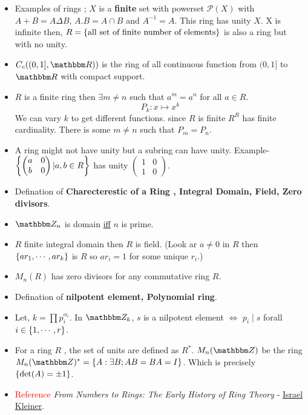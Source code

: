 \documentclass[lec]{subfiles}
\begin{document}
\begin{itemize}
    \item Examples of rings ; $X$ is a \textbf{finite} set with powerset $\mathcal{P}(X)$ with $A+B = A \Delta B$, $A.B = A \cap B$ and $A^{-1} = A$. This ring has unity $X$. X is infinite then, $R = \qty{ \text{all set of finite number of elements}}$ is also a ring but with no unity.
    \item $C_c((0,1], \R))$ is the ring of all continuous function from $(0,1]$ to $\R$ with compact support.
    \item $R$ is a finite ring then $\exists m\neq n$ such that $a^{m} = a^{n}$ for all $ a \in R$. \[ P_k : x \mapsto x^k \] We can vary $k$ to get different functions. since $R$ is finite $R^R$ has finite cardinality. There is some $m \neq n$ such that $P_m = P_n$.
    \item A ring might not have unity but a subring can have unity. Example- $\qty{\begin{pmatrix} a & 0 \\ b & 0 \end{pmatrix} | a,b \in {R}}$ has unity $\begin{pmatrix} 1 & 0 \\ 1 & 0 \end{pmatrix}$.
    \item Defination of \textbf{Charecterestic of a Ring , Integral Domain, Field, Zero divisors}.
    \item $\Z_n$ is domain \href{https://math.stackexchange.com/questions/3327213/a-proof-that-mathbbz-p-is-an-integral-domain-if-and-only-if-p-is-prime}{iff} $n$ is prime.
    \item $R$ finite integral domain then $R$ is field. (Look ar $a \neq 0$ in $R$ then $\qty{ar_1, \cdots, ar_k}$ is $R$ so $ar_i = 1$ for some unique $r_i$.)
    \item $M_n(R)$ has zero divisors for any commutative ring $R$.
    \item Defination of \textbf{nilpotent element, Polynomial ring}.
    \item Let, $k = \prod p_i^{\alpha_i}$. In $\Z_k$, $s$ is a nilpotent element \href{https://math.stackexchange.com/questions/1222586/if-n-p-1a-1-cdots-p-ra-r-the-set-of-nilpotents-of-mathbbz-n-is}{$\Leftrightarrow$} $p_i \mid s$ forall $i \in \qty{1,\cdots,r}$.
    \item For a ring $R$ , the set of units are defined as $R^*$. $M_n(\Z)$ be the ring $M_n(\Z)^* = \qty{A :  \exists B; AB = BA = I}$. Which is precisely $\qty{\det(A) = \pm 1}$.
    \item \textcolor{red}{Reference} \textit{From Numbers to Rings: The Early History of Ring Theory} - \href{https://ems.press/content/serial-article-files/699}{\color{magenta}Israel Kleiner}.
\end{itemize}
\end{document}
